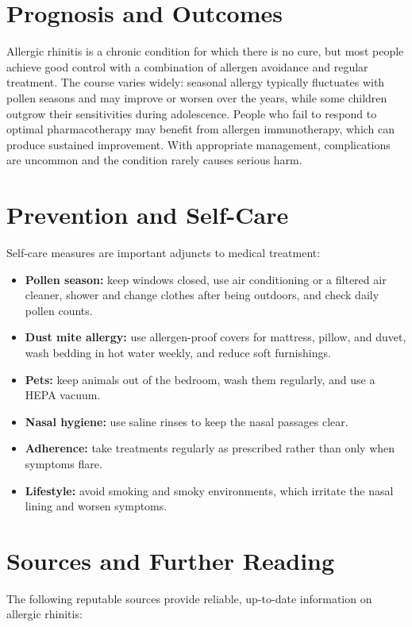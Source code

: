 \section*{Prognosis and Outcomes}
Allergic rhinitis is a chronic condition for which there is no cure, but most people achieve good control with a combination of allergen avoidance and regular treatment. The course varies widely: seasonal allergy typically fluctuates with pollen seasons and may improve or worsen over the years, while some children outgrow their sensitivities during adolescence. People who fail to respond to optimal pharmacotherapy may benefit from allergen immunotherapy, which can produce sustained improvement. With appropriate management, complications are uncommon and the condition rarely causes serious harm.

\section*{Prevention and Self-Care}
Self-care measures are important adjuncts to medical treatment:

\begin{itemize}
    \item \textbf{Pollen season:} keep windows closed, use air conditioning or a filtered air cleaner, shower and change clothes after being outdoors, and check daily pollen counts.
    \item \textbf{Dust mite allergy:} use allergen-proof covers for mattress, pillow, and duvet, wash bedding in hot water weekly, and reduce soft furnishings.
    \item \textbf{Pets:} keep animals out of the bedroom, wash them regularly, and use a HEPA vacuum.
    \item \textbf{Nasal hygiene:} use saline rinses to keep the nasal passages clear.
    \item \textbf{Adherence:} take treatments regularly as prescribed rather than only when symptoms flare.
    \item \textbf{Lifestyle:} avoid smoking and smoky environments, which irritate the nasal lining and worsen symptoms.
\end{itemize}

\section*{Sources and Further Reading}
The following reputable sources provide reliable, up-to-date information on allergic rhinitis:

